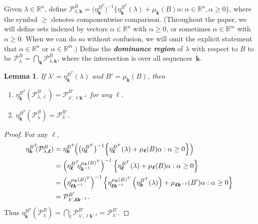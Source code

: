 \documentclass{amsart}
\newtheorem{lemma}[proposition]{Lemma}
\theoremstyle{definition}
\theoremstyle{remark}
\numberwithin{equation}{section}
\newcommand{\newword}[1]{\textbf{\emph{#1}}}
\newcommand{\reals}{\mathbb R}
\newcommand{\set}[1]{{\lbrace #1 \rbrace}}
\newcommand{\sett}[1]{{\bigl\lbrace #1 \bigr\rbrace}}
\newcommand{\settt}[1]{{\Bigl\lbrace #1 \Bigr\rbrace}}
\newcommand{\0}{{\mathbf{0}}}
\newcommand{\kk}{{\boldsymbol{k}}}
\renewcommand{\ll}{{\boldsymbol\ell}}
\renewcommand{\P}{\mathcal{P}}
\begin{document}
Given $\lambda\in\reals^n$, define $\P^B_{\lambda,\kk}=\bigl(\eta_{\kk}^{B^T}\bigr)^{-1}\sett{\eta_\kk^{B^T}(\lambda)+\mu_\kk(B)\alpha:\alpha\in\reals^n,\alpha\ge0}$, where the symbol $\ge$ denotes componentwise comparison.
(Throughout the paper, we will define sets indexed by vectors $\alpha\in\reals^n$ with $\alpha\ge0$, or sometimes $\alpha\in\reals^m$ with $\alpha\ge0$.
When we can do so without confusion, we will omit the explicit statement that $\alpha\in\reals^n$ or $\alpha\in\reals^m$.)
Define the \newword{dominance region} of $\lambda$ with respect to $B$ to be $\P^B_\lambda=\bigcap_\kk\P^B_{\lambda,\kk}$, where the intersection is over all sequences~$\kk$.
\begin{lemma}\label{shift}
If $\lambda'=\eta^{B^T}_\kk(\lambda)$ and $B'=\mu_\kk(B)$, then 
\begin{enumerate}[label=\bf\arabic*., ref=\arabic*]
\item \label{shift one}
$\eta^{B^T}_\kk\!\!(\P^B_{\lambda,\ll})=\P^{B'}_{\lambda',\ll\kk^{-1}}$ for any $\ll$.
\item \label{shift all}
$\eta^{B^T}_\kk\!\!(\P^B_\lambda)=\P^{B'}_{\lambda'}$.
\end{enumerate}
\end{lemma}
\begin{proof}
For any $\ll$,
\begin{align*}
\eta^{B^T}_\kk\!\!(\P^B_{\lambda,\ll})
&=\eta^{B^T}_\kk\!\!\left(\bigl(\eta_{\ll}^{B^T}\bigr)^{-1}\settt{\eta_\ll^{B^T}(\lambda)+\mu_\ll(B)\alpha:\alpha\ge0}\right)\\
&=\left(\eta^{B^T}_\ll\!\!\eta_{\kk^{-1}}^{\mu_\kk(B)^T}\right)^{-1}\settt{\eta_\ll^{B^T}(\lambda)+\mu_\ll(B)\alpha:\alpha\ge0}\\
&=\left(\eta^{\mu_\kk(B)^T}_{\ll\kk^{-1}}\right)^{-1}\settt{\eta^{\mu_\kk(B)^T}_{\ll\kk^{-1}}\left(\eta^{B^T}_\kk(\lambda)\right)+\mu_{\ll\kk^{-1}}(B')\alpha:\alpha\ge0}\\
&=\P^{B'}_{\lambda',\ll\kk^{-1}}.
\end{align*}
Thus $\eta^{B^T}_\kk\!\!(\P^B_\lambda)=\bigcap_\ll\P^{B'}_{\lambda',\ll\kk^{-1}}=\P^{B'}_{\lambda'}$.
\end{proof}
\end{document}
